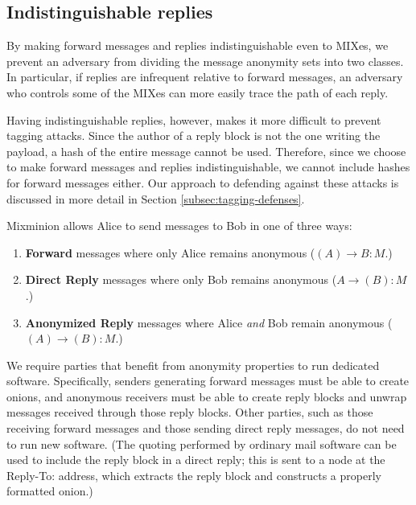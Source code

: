 \documentclass[11pt]{IEEEtran}
\begin{document}
\subsection{Indistinguishable replies}
\label{subsec:header-swap}

By making forward messages and replies indistinguishable even to MIXes,
we prevent an
adversary from dividing the message anonymity sets into two classes. In
particular, if replies are infrequent relative to forward messages,
an adversary who controls some of the MIXes can more easily trace the
path of each reply.

Having indistinguishable replies, however, makes it more difficult to
prevent tagging attacks.  Since the author of a reply block is not the
one writing the payload, a hash of the entire message cannot be used.
Therefore, since we choose to make forward messages and replies
indistinguishable, we cannot include hashes for forward messages either.
Our approach to defending against these attacks is discussed in more
detail in Section \ref{subsec:tagging-defenses}.

Mixminion allows Alice to send messages to Bob in one of three ways:

\begin{enumerate}
\item \textbf{Forward} messages where only Alice remains anonymous
($(A) \rightarrow B: M$.) 
\item \textbf{Direct Reply} messages where only Bob remains anonymous 
($A \rightarrow (B): M$.)
\item \textbf{Anonymized Reply} messages where Alice \emph{and} Bob
   remain anonymous ($(A) \rightarrow (B): M$.)
\end{enumerate}

We require parties that benefit from anonymity properties to run dedicated
software.  Specifically, senders generating forward messages must be able
to create onions, and anonymous receivers must be able to create reply blocks
and unwrap messages received through those reply blocks. Other parties,
such as those receiving forward messages and those sending direct reply
messages, do not need to run new software. (The quoting
performed by ordinary mail software can be used to include the reply
block in a direct reply; this is sent to a node at the Reply-To:
address, which extracts the reply block and constructs a properly
formatted onion.)
\end{document}
